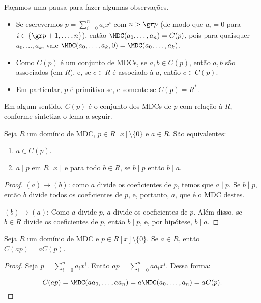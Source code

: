     Façamos uma pausa para fazer algumas observações.
    
    \begin{itemize}
        \item Se escrevermos $p=\sum_{i=0}^n a_i x^i$ com $n>\gr p$ (de modo que $a_i=0$ para $i\in\{\gr p+1, \dots, n\}$), então $\MDC(a_0, \dots, a_n)=C(p)$, pois para quaisquer $a_0, \dots, a_k$, vale $\MDC(a_0, \dots, a_k, 0)=\MDC(a_0, \dots, a_k)$.
        \item Como $C(p)$ é um conjunto de MDCs, se $a, b \in C(p)$, então $a, b$ são associados (em $R$), e, se $c\in R$ é associado à $a$, então $c\in C(p)$.
        \item Em particular, $p$ é primitivo se, e somente se $C(p)=R^*$.
    \end{itemize}

    Em algum sentido, $C(p)$ é o conjunto dos MDCs de $p$ com relação à $R$, conforme sintetiza o lema a seguir.

    \begin{lemma}
        Seja $R$ um domínio de MDC, $p \in R[x]\setminus\{0\}$ e $a\in R$. São equivalentes:
        \begin{enumerate}[label=(\alph*)]
            \item $a\in C(p)$.
            \item $a\mid p$ em $R[x]$ e para todo $b \in R$, se $b\mid p$ então $b\mid a$.
        \end{enumerate}
    \end{lemma}
    \begin{proof}
        $(a)\rightarrow (b)$: como $a$ divide os coeficientes de $p$, temos que $a\mid p$. Se $b\mid p$, então $b$ divide todos os coeficientes de $p$, e, portanto, $a$, que é o MDC destes.

        $(b)\rightarrow (a)$: Como $a$ divide $p$, $a$ divide os coeficientes de $p$. Além disso, se $b\in R$ divide os coeficientes de $p$, então $b\mid p$, e, por hipótese, $b\mid a$.
    \end{proof}


    \begin{lemma}
        Seja $R$ um domínio de MDC e $p \in R[x]\setminus\{0\}$. Se $a\in R$, então $C(ap)=aC(p)$.
    \end{lemma}
    \begin{proof}
        Seja $p=\sum_{i=0}^n a_i x^i$. Então $ap=\sum_{i=0}^n aa_i x^i$.
        Dessa forma:
        
        \begin{equation*}
            C(ap)=\MDC(aa_0, \dots, aa_n)=a\MDC(a_0, \dots, a_n)=aC(p).
        \end{equation*}
    \end{proof}
    
